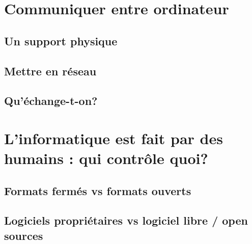 \documentclass{beamer}
\begin{document}







\section{Communiquer entre ordinateur} %
\subsection{Un support physique}%
\subsection{Mettre en réseau}%
\subsection{Qu'échange-t-on?}%

\section[Qui contrôle quoi?]{L'informatique est fait par des humains : qui contrôle quoi?}
\subsection{Formats fermés vs formats ouverts}
\subsection{Logiciels propriétaires vs logiciel libre / open sources} %
\end{document}
